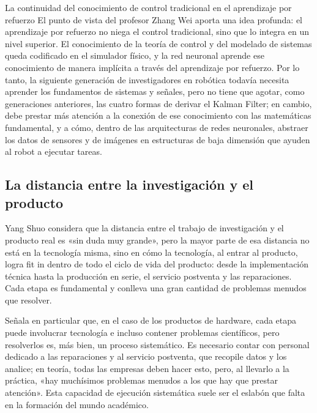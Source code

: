 \documentclass[a4paper]{article}
\begin{document}
\begin{importantbox}{La continuidad del conocimiento de control tradicional en el aprendizaje por refuerzo}
El punto de vista del profesor Zhang Wei aporta una idea profunda: el aprendizaje por refuerzo no niega el control tradicional, sino que lo integra en un nivel superior. El conocimiento de la teoría de control y del modelado de sistemas queda codificado en el simulador físico, y la red neuronal aprende ese conocimiento de manera implícita a través del aprendizaje por refuerzo. Por lo tanto, la siguiente generación de investigadores en robótica todavía necesita aprender los fundamentos de sistemas y señales, pero no tiene que agotar, como generaciones anteriores, las cuatro formas de derivar el Kalman Filter; en cambio, debe prestar más atención a la conexión de ese conocimiento con las matemáticas fundamental, y a cómo, dentro de las arquitecturas de redes neuronales, abstraer los datos de sensores y de imágenes en estructuras de baja dimensión que ayuden al robot a ejecutar tareas.
\end{importantbox}

\subsection{La distancia entre la investigación y el producto}

Yang Shuo considera que la distancia entre el trabajo de investigación y el producto real es «sin duda muy grande», pero la mayor parte de esa distancia no está en la tecnología misma, sino en cómo la tecnología, al entrar al producto, logra fit in dentro de todo el ciclo de vida del producto: desde la implementación técnica hasta la producción en serie, el servicio postventa y las reparaciones. Cada etapa es fundamental y conlleva una gran cantidad de problemas menudos que resolver.

Señala en particular que, en el caso de los productos de hardware, cada etapa puede involucrar tecnología e incluso contener problemas científicos, pero resolverlos es, más bien, un proceso sistemático. Es necesario contar con personal dedicado a las reparaciones y al servicio postventa, que recopile datos y los analice; en teoría, todas las empresas deben hacer esto, pero, al llevarlo a la práctica, «hay muchísimos problemas menudos a los que hay que prestar atención». Esta capacidad de ejecución sistemática suele ser el eslabón que falta en la formación del mundo académico.
\end{document}
